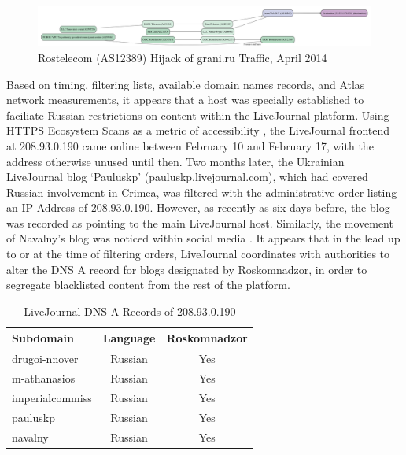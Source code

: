 \begin{figure}
  \includegraphics[width=\textwidth]{diagrams/atlas_cache-results-measurement_id-1663748.png}
  \caption{Rostelecom (AS12389) Hijack of grani.ru Traffic, April 2014}
  \label{image:ru-grani-hijack}
\end{figure}

Based on timing, filtering lists, available domain names records, and
Atlas network measurements, it appears that a host was specially
established to faciliate Russian restrictions on content within the
LiveJournal platform. Using HTTPS Ecosystem Scans as a metric of
accessibility \cite{projectsonar}, the LiveJournal frontend at
208.93.0.190 came online between February 10 and February 17, with the
address otherwise unused until then. Two months later, the Ukrainian
LiveJournal blog `Pauluskp' (pauluskp.livejournal.com), which had
covered Russian involvement in Crimea, was filtered with the
administrative order listing an IP Address of 208.93.0.190. However, as
recently as six days before, the blog was recorded as pointing to the
main LiveJournal host. Similarly, the movement of Navalny's blog was
noticed within social media \cite{miptru2014}. It appears that in the
lead up to or at the time of filtering orders, LiveJournal coordinates
with authorities to alter the DNS A record for blogs designated by
Roskomnadzor, in order to segregate blacklisted content from the rest of
the platform.

\begin{table}
    \begin{tabular}{l | c | c}
        \textbf{Subdomain} & \textbf{Language} & \textbf{Roskomnadzor}\\
        \hline
        drugoi-nnover & Russian & Yes\\
        m-athanasios & Russian & Yes\\
        imperialcommiss & Russian & Yes\\
        pauluskp & Russian & Yes \\
        navalny & Russian & Yes \\
        \hline
    \end{tabular}
    \caption{LiveJournal DNS A Records of 208.93.0.190}
    \label{table:lj-blocked-blogs}
\end{table}

